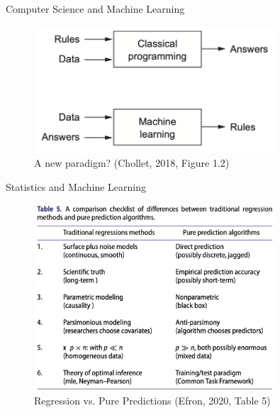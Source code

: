 \documentclass[10pt]{beamer}
\begin{document}
\begin{frame}{Computer Science and Machine Learning}

\begin{figure}[h]
\caption{A new paradigm? (Chollet, 2018, Figure 1.2)}
\centering
\includegraphics[width=0.8\textwidth]{figs/fig1_2_chollet.png}
\end{figure}

\end{frame}


\begin{frame}{Statistics and Machine Learning}

\begin{figure}[h]
\caption{Regression vs. Pure Predictions (Efron, 2020, Table 5)}
\centering
\includegraphics[width=0.8\textwidth]{figs/table5.png}
\end{figure}

\end{frame}
\end{document}
